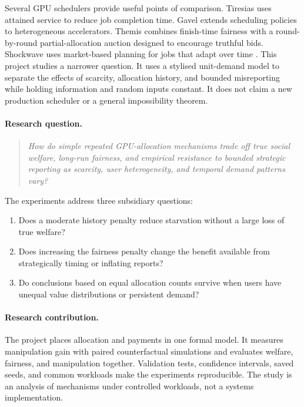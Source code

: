 \documentclass{article}
\begin{document}
Several GPU schedulers provide useful points of comparison. Tiresias uses
attained service to reduce job completion time. Gavel extends scheduling
policies to heterogeneous accelerators. Themis combines finish-time fairness
with a round-by-round partial-allocation auction designed to encourage truthful
bids. Shockwave uses market-based planning for jobs that adapt over time
\cite{gu2019tiresias,narayanan2020heterogeneity,mahajan2020themis,
zheng2023shockwave}. This project studies a narrower question. It uses a
stylised unit-demand model to separate the effects of scarcity, allocation
history, and bounded misreporting while holding information and random inputs
constant. It does not claim a new production scheduler or a general
impossibility theorem.

\paragraph{Research question.}
\begin{quote}
\emph{How do simple repeated GPU-allocation mechanisms trade off true social
welfare, long-run fairness, and empirical resistance to bounded strategic
reporting as scarcity, user heterogeneity, and temporal demand patterns vary?}
\end{quote}

The experiments address three subsidiary questions:
\begin{enumerate}
  \item Does a moderate history penalty reduce starvation without a large loss
        of true welfare?
  \item Does increasing the fairness penalty change the benefit available from
        strategically timing or inflating reports?
  \item Do conclusions based on equal allocation counts survive when users
        have unequal value distributions or persistent demand?
\end{enumerate}

\paragraph{Research contribution.}
The project places allocation and payments in one formal model. It measures
manipulation gain with paired counterfactual simulations and evaluates welfare,
fairness, and manipulation together. Validation tests, confidence intervals,
saved seeds, and common workloads make the experiments reproducible. The study
is an analysis of mechanisms under controlled workloads, not a systems
implementation.
\end{document}
